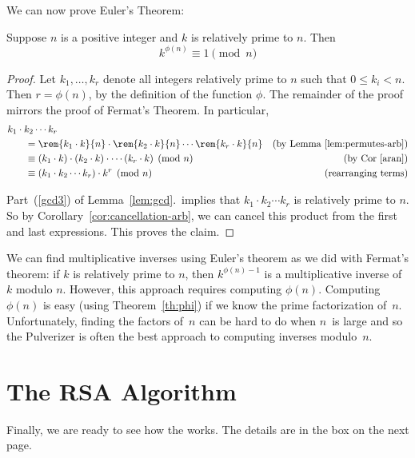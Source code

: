 We can now prove Euler's Theorem:

\begin{theorem}
Suppose $n$ is a positive integer and $k$ is relatively prime to $n$.
Then
\begin{equation*}
    k^{\phi(n)} \equiv 1 \pmod{n}
\end{equation*}
\end{theorem}

\begin{proof}
Let $k_1, \dots, k_r$ denote all integers relatively prime to $n$
such that $0 \leq k_i < n$.  Then $r = \phi(n)$, by the definition of
the function $\phi$.  The remainder of the proof mirrors the proof of
Fermat's Theorem.  In particular,
%
\begin{align*}
\lefteqn{k_1 \cdot k_2 \cdots k_r} \hspace{0.25in} \\
& =
\rem{k_1 \cdot k}{n} \cdot
\rem{k_2 \cdot k}{n} \cdots
\rem{k_r \cdot k}{n} & \text{(by Lemma~\ref{lem:permutes-arb})}
\\
& \equiv
(k_1 \cdot k) \cdot
(k_2 \cdot k) \cdot
\cdots
(k_r \cdot k) \pmod{n} & \text{(by Cor~\ref{aran})}
\\
& \equiv
(k_1 \cdot k_2 \cdots k_r) \cdot k^r \pmod{n} & \text{(rearranging terms)}
\end{align*}

Part~(\ref{gcd3}) of Lemma~\ref{lem:gcd}.\ implies that $k_1 \cdot k_2
\cdots k_r$ is relatively prime to $n$.  So by
Corollary~\ref{cor:cancellation-arb}, we can cancel this product from
the first and last expressions.  This proves the claim.
\end{proof}

We can find multiplicative inverses using Euler's theorem as we did
with Fermat's theorem: if $k$ is relatively prime to $n$, then
$k^{\phi(n) - 1}$ is a multiplicative inverse of $k$ modulo $n$.
However, this approach requires computing $\phi(n)$.  Computing
$\phi(n)$ is easy (using Theorem~\ref{th:phi}) if we know the prime
factorization of~$n$.  Unfortunately, finding the factors of~$n$ can
be hard to do when $n$~is large and so the Pulverizer is often the
best approach to computing inverses modulo~$n$.

\section{The RSA Algorithm}
Finally, we are ready to see how the  works.  The details are in the box on the next page.

